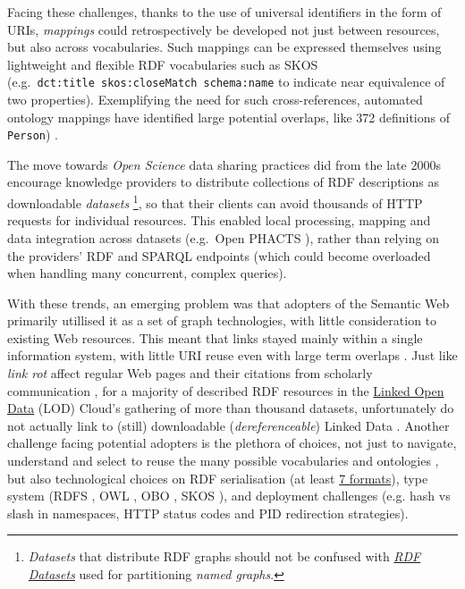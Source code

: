 Facing these challenges, thanks to the use of universal identifiers in the form of URIs, \emph{mappings} could retrospectively be developed not just between resources, but also across vocabularies. Such mappings can be expressed themselves using lightweight and flexible RDF vocabularies such as SKOS \cite{w3-skos-primer} (e.g.~\texttt{dct:title\ skos:closeMatch\ schema:name} to indicate near equivalence of two properties). Exemplifying the need for such cross-references, automated ontology mappings have identified large potential overlaps, like 372 definitions of \texttt{Person}) \cite{huHowMatchableAre2011a}.

The move towards \emph{Open Science} data sharing practices did from the late 2000s encourage knowledge providers to distribute collections of RDF descriptions as downloadable \emph{datasets} \footnote{\emph{Datasets} that distribute RDF graphs should not be confused with \href{https://www.w3.org/TR/rdf11-concepts/\#section-dataset}{\emph{RDF Datasets}} used for partitioning \emph{named graphs}.}, so that their clients can avoid thousands of HTTP requests for individual resources. This enabled local processing, mapping and data integration across datasets (e.g.~Open PHACTS \cite{grothAPIcentricLinkedData2014b}), rather than relying on the providers' RDF and SPARQL endpoints (which could become overloaded when handling many concurrent, complex queries).

With these trends, an emerging problem was that adopters of the Semantic Web primarily utillised it as a set of graph technologies, with little consideration to existing Web resources. This meant that links stayed mainly within a single information system, with little URI reuse even with large term overlaps \cite{kamdarSystematicAnalysisTerm2017a}. Just like \emph{link rot} affect regular Web pages and their citations from scholarly communication \cite{kleinScholarlyContextNot2014a}, for a majority of described RDF resources in the \href{https://lod-cloud.net/}{Linked Open Data} (LOD) Cloud's gathering of more than thousand datasets, unfortunately do not actually link to (still) downloadable (\emph{dereferenceable}) Linked Data \cite{polleresMoreDecentralizedVision2020a}. Another challenge facing potential adopters is the plethora of choices, not just to navigate, understand and select to reuse the many possible vocabularies and ontologies \cite{carrieroLandscapeOntologyReuse2020a}, but also technological choices on RDF serialisation (at least \href{https://www.w3.org/TR/rdf11-primer/\#section-graph-syntax}{7 formats}), type system (RDFS \cite{w3-rdf-schema}, OWL \cite{w3-owl2-overview}, OBO \cite{tirmiziMappingOBOOWL2011a}, SKOS \cite{w3-skos-primer}), and deployment challenges \cite{sauermannCoolURIsSemantic2011} (e.g. hash vs slash in namespaces, HTTP status codes and PID redirection strategies).

